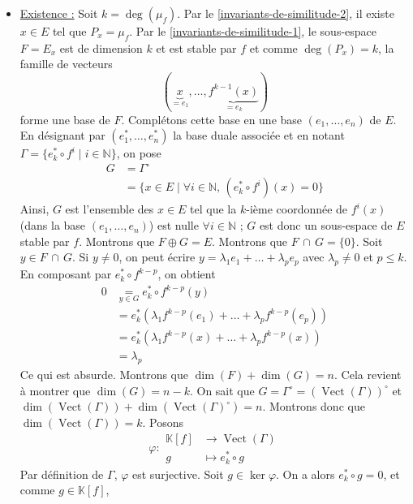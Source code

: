 	\begin{demonstration}
		\begin{itemize}
			\item \underline{Existence :} Soit $k = \deg(\mu_f)$. Par le \cref{invariants-de-similitude-2}, il existe $x \in E$ tel que $P_x = \mu_f$. Par le \cref{invariants-de-similitude-1}, le sous-espace $F = E_x$ est de dimension $k$ et est stable par $f$ et comme $\deg(P_x) = k$, la famille de vecteurs
			\[ (\underbrace{x}_{= e_1}, \dots, \underbrace{f^{k-1}(x)}_{= e_k}) \]
			forme une base de $F$. Complétons cette base en une base $(e_1, \dots, e_n)$ de $E$. En désignant par $(e_1^*, \dots, e_n^*)$ la base duale associée et en notant $\Gamma = \{ e_k^* \circ f^i \mid i \in \mathbb{N} \}$, on pose
			\begin{align*}
				G &= \Gamma^\circ \\
				&= \{ x \in E \mid \forall i \in \mathbb{N}, \, (e_k^* \circ f^i)(x) = 0 \}
			\end{align*}
			Ainsi, $G$ est l'ensemble des $x \in E$ tel que la $k$-ième coordonnée de $f^i(x)$ (dans la base $(e_1, \dots, e_n)$)  est nulle $\forall i \in \mathbb{N}$ ; $G$ est donc un sous-espace de $E$ stable par $f$. Montrons que $F \oplus G = E$.
			\newpar
			Montrons que $F \, \cap \, G = \{ 0 \}$. Soit $y \in F \, \cap \, G$. Si $y \neq 0$, on peut écrire $y = \lambda_1 e_1 + \dots + \lambda_p e_p$ avec $\lambda_p \neq 0$ et $p \leq k$. En composant par $e_k^* \circ f^{k-p}$, on obtient
			\begin{align*}
				0 &\underset{y \in G}{=} e_k^* \circ f^{k-p}(y) \\
				&= e_k^* (\lambda_1 f^{k-p}(e_1) + \dots + \lambda_p f^{k-p}(e_p)) \\
				&= e_k^* (\lambda_1 f^{k-p}(x) + \dots + \lambda_p f^{k-p}(x)) \\
				&= \lambda_p
			\end{align*}
			Ce qui est absurde.
			\newpar
			Montrons que $\dim(F) + \dim(G) = n$. Cela revient à montrer que $\dim(G) = n - k$. On sait que $G = \Gamma^\circ = (\operatorname{Vect}(\Gamma))^\circ$ et $\dim(\operatorname{Vect}(\Gamma)) + \dim(\operatorname{Vect}(\Gamma)^\circ) = n$. Montrons donc que $\dim(\operatorname{Vect}(\Gamma)) = k$. Posons
			\[
			\varphi :
			\begin{array}{cl}
				\mathbb{K}[f] &\rightarrow \operatorname{Vect}(\Gamma) \\
				g &\mapsto e_k^* \circ g
			\end{array}
			\]
			Par définition de $\Gamma$, $\varphi$ est surjective. Soit $g \in \ker{\varphi}$. On a alors $e_k^* \circ g = 0$, et comme $g \in \mathbb{K}[f]$,

\end{itemize}
\end{demonstration}
